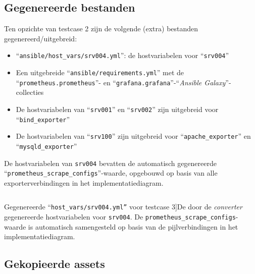 \subsection{Gegenereerde bestanden}%
\label{subsec:testcase3_gegenereerd}

Ten opzichte van testcase 2 zijn de volgende (extra) bestanden gegenereerd/uitgebreid:

\begin{itemize}
    \item ``\texttt{ansible/host\_vars/srv004.yml}'': de hostvariabelen voor ``\texttt{srv004}''
    \item Een uitgebreide ``\texttt{ansible/requirements.yml}'' met de \\``\texttt{prometheus.prometheus}''- en ``\texttt{grafana.grafana}''-``\emph{Ansible Galaxy}''-collecties
    \item De hostvariabelen van ``\texttt{srv001}'' en ``\texttt{srv002}'' zijn uitgebreid voor \\``\texttt{bind\_exporter}''
    \item De hostvariabelen van ``\texttt{srv100}'' zijn uitgebreid voor ``\texttt{apache\_exporter}'' en ``\texttt{mysqld\_exporter}''
\end{itemize}

De hostvariabelen van \texttt{srv004} bevatten de automatisch gegenereerde \\``\texttt{prometheus\_scrape\_configs}''-waarde, opgebouwd op basis van alle exporterverbindingen in het implementatiediagram.

\begin{codeblockfixed}
    \begin{codeblock}
        \inputminted{yaml}{../project_files/output/infra_auto_lab_3_env/ansible/host_vars/srv004.yml}
        \caption[Gegenereerde ``\texttt{host\_vars/srv004.yml''} voor testcase 3]{De door de \emph{converter} gegenereerde hostvariabelen voor \texttt{srv004}. De \texttt{prometheus\_scrape\_configs}-waarde is automatisch samengesteld op basis van de pijlverbindingen in het implementatiediagram.}
        \label{code:hostvars_srv004}
    \end{codeblock}
\end{codeblockfixed}

\subsection{Gekopieerde assets}%
\label{subsec:testcase3_assets}

